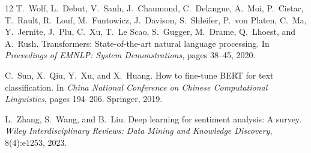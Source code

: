 \documentclass[10pt,twocolumn,a4paper]{article}
\begin{document}
\begin{thebibliography}{12}
T.~Wolf, L.~Debut, V.~Sanh, J.~Chaumond, C.~Delangue, A.~Moi, P.~Cistac, T.~Rault, R.~Louf, M.~Funtowicz, J.~Davison, S.~Shleifer, P.~von Platen, C.~Ma, Y.~Jernite, J.~Plu, C.~Xu, T.~Le Scao, S.~Gugger, M.~Drame, Q.~Lhoest, and A.~Rush.
\newblock Transformers: State-of-the-art natural language processing.
\newblock In \emph{Proceedings of EMNLP: System Demonstrations}, pages 38--45, 2020.

C.~Sun, X.~Qiu, Y.~Xu, and X.~Huang.
\newblock How to fine-tune {BERT} for text classification.
\newblock In \emph{China National Conference on Chinese Computational Linguistics}, pages 194--206. Springer, 2019.

L.~Zhang, S.~Wang, and B.~Liu.
\newblock Deep learning for sentiment analysis: A survey.
\newblock \emph{Wiley Interdisciplinary Reviews: Data Mining and Knowledge Discovery}, 8(4):e1253, 2023.

\end{thebibliography}
\end{document}
